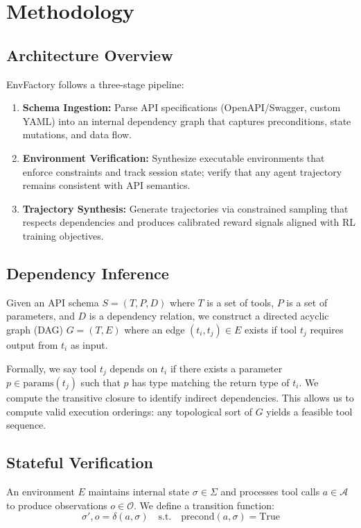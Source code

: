 \documentclass[11pt,a4paper]{article}
\begin{document}
\section{Methodology}

\subsection{Architecture Overview}

EnvFactory follows a three-stage pipeline:

\begin{enumerate}
\item \textbf{Schema Ingestion:} Parse API specifications (OpenAPI/Swagger, custom YAML) into an internal dependency graph that captures preconditions, state mutations, and data flow.
\item \textbf{Environment Verification:} Synthesize executable environments that enforce constraints and track session state; verify that any agent trajectory remains consistent with API semantics.
\item \textbf{Trajectory Synthesis:} Generate trajectories via constrained sampling that respects dependencies and produces calibrated reward signals aligned with RL training objectives.
\end{enumerate}

\subsection{Dependency Inference}

Given an API schema $S = (T, P, D)$ where $T$ is a set of tools, $P$ is a set of parameters, and $D$ is a dependency relation, we construct a directed acyclic graph (DAG) $G = (T, E)$ where an edge $(t_i, t_j) \in E$ exists if tool $t_j$ requires output from $t_i$ as input.

Formally, we say tool $t_j$ depends on $t_i$ if there exists a parameter $p \in \text{params}(t_j)$ such that $p$ has type matching the return type of $t_i$. We compute the transitive closure to identify indirect dependencies. This allows us to compute valid execution orderings: any topological sort of $G$ yields a feasible tool sequence.

\subsection{Stateful Verification}

An environment $E$ maintains internal state $\sigma \in \Sigma$ and processes tool calls $a \in \mathcal{A}$ to produce observations $o \in \mathcal{O}$. We define a transition function:
\begin{equation}
\sigma', o = \delta(a, \sigma) \quad \text{s.t.} \quad \text{precond}(a, \sigma) = \text{True}
\end{equation}
\end{document}
